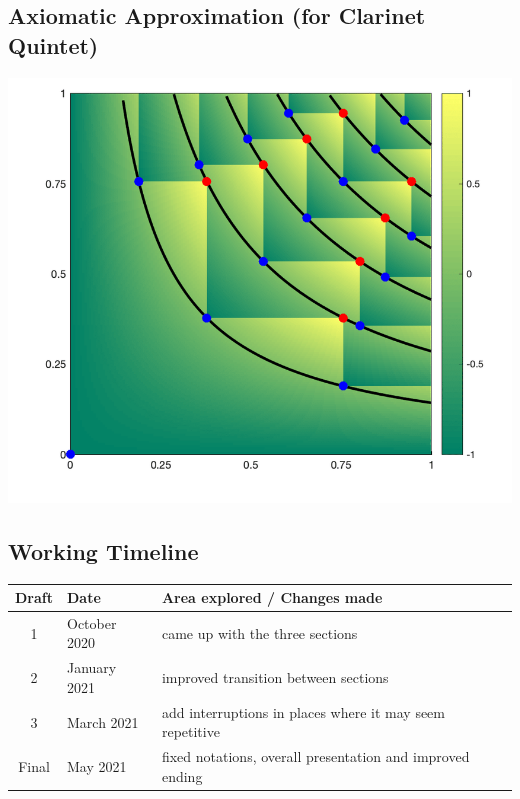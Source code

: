 \documentclass{article}
\begin{document}
\begin{center}
\vspace*{\fill}
\LARGE
    \section{Axiomatic Approximation (for Clarinet Quintet)}
    \includegraphics[width=\textwidth]{approximation.png}
\vspace*{\fill}
\end{center}
\subsection{Working Timeline}

\begin{center}
	\def\arraystretch{1.5}
\begin{tabular}{|c|l|l|}
	\hline
	Draft&Date&Area explored / Changes made\\
	\hline
	1&October 2020&
    came up with the three sections\\
	\hline
	2&January 2021&
    improved transition between sections\\
	\hline
	3&March 2021&
    add interruptions in places where it may seem repetitive\\
	\hline
	Final&May 2021&
    fixed notations, overall presentation and improved ending\\
	\hline
\end{tabular}
\end{center}
\end{document}
